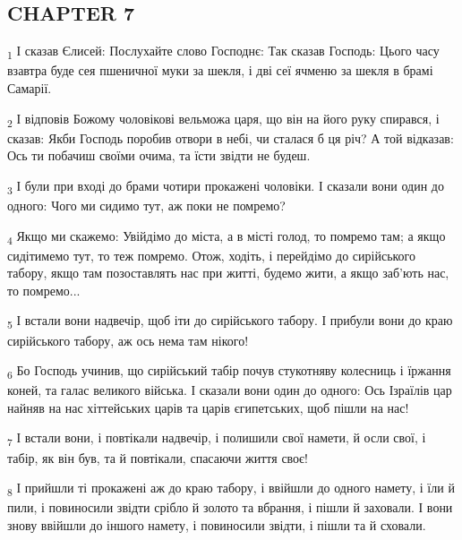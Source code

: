 \subsection{CHAPTER 7}
\begin{tcolorbox}
\textsubscript{1} І сказав Єлисей: Послухайте слово Господнє: Так сказав Господь: Цього часу взавтра буде сея пшеничної муки за шекля, і дві сеї ячменю за шекля в брамі Самарії.
\end{tcolorbox}
\begin{tcolorbox}
\textsubscript{2} І відповів Божому чоловікові вельможа царя, що він на його руку спирався, і сказав: Якби Господь поробив отвори в небі, чи сталася б ця річ? А той відказав: Ось ти побачиш своїми очима, та їсти звідти не будеш.
\end{tcolorbox}
\begin{tcolorbox}
\textsubscript{3} І були при вході до брами чотири прокажені чоловіки. І сказали вони один до одного: Чого ми сидимо тут, аж поки не помремо?
\end{tcolorbox}
\begin{tcolorbox}
\textsubscript{4} Якщо ми скажемо: Увійдімо до міста, а в місті голод, то помремо там; а якщо сидітимемо тут, то теж помремо. Отож, ходіть, і перейдімо до сирійського табору, якщо там позоставлять нас при житті, будемо жити, а якщо заб'ють нас, то помремо...
\end{tcolorbox}
\begin{tcolorbox}
\textsubscript{5} І встали вони надвечір, щоб іти до сирійського табору. І прибули вони до краю сирійського табору, аж ось нема там нікого!
\end{tcolorbox}
\begin{tcolorbox}
\textsubscript{6} Бо Господь учинив, що сирійський табір почув стукотняву колесниць і їржання коней, та галас великого війська. І сказали вони один до одного: Ось Ізраїлів цар найняв на нас хіттейських царів та царів єгипетських, щоб пішли на нас!
\end{tcolorbox}
\begin{tcolorbox}
\textsubscript{7} І встали вони, і повтікали надвечір, і полишили свої намети, й осли свої, і табір, як він був, та й повтікали, спасаючи життя своє!
\end{tcolorbox}
\begin{tcolorbox}
\textsubscript{8} І прийшли ті прокажені аж до краю табору, і ввійшли до одного намету, і їли й пили, і повиносили звідти срібло й золото та вбрання, і пішли й заховали. І вони знову ввійшли до іншого намету, і повиносили звідти, і пішли та й сховали.
\end{tcolorbox}
